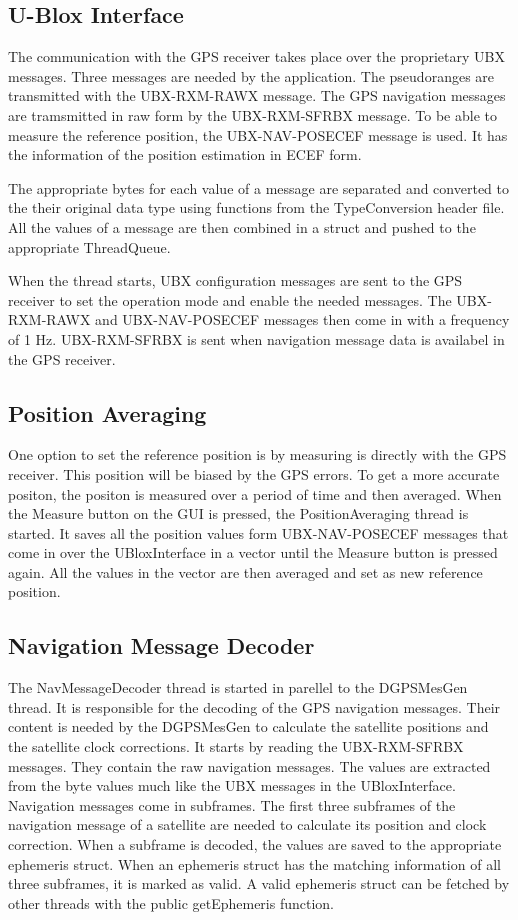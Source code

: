 \subsection{U-Blox Interface}

The communication with the GPS receiver takes place over the proprietary UBX messages.
Three messages are needed by the application.
The pseudoranges are transmitted with the UBX-RXM-RAWX message.
The GPS navigation messages are tramsmitted in raw form by the UBX-RXM-SFRBX message.
To be able to measure the reference position, the UBX-NAV-POSECEF message is used.
It has the information of the position estimation in ECEF form.

The appropriate bytes for each value of a message are separated and converted to the their original data type using functions from the TypeConversion header file.
All the values of a message are then combined in a struct and pushed to the appropriate ThreadQueue.

When the thread starts, UBX configuration messages are sent to the GPS receiver to set the operation mode and enable the needed messages.
The UBX-RXM-RAWX and UBX-NAV-POSECEF messages then come in with a frequency of 1 Hz.
UBX-RXM-SFRBX is sent when navigation message data is availabel in the GPS receiver.

\subsection{Position Averaging}

One option to set the reference position is by measuring is directly with the GPS receiver.
This position will be biased by the GPS errors.
To get a more accurate positon, the positon is measured over a period of time and then averaged.
When the Measure button on the GUI is pressed, the PositionAveraging thread is started.
It saves all the position values form UBX-NAV-POSECEF messages that come in over the UBloxInterface in a vector until the Measure button is pressed again.
All the values in the vector are then averaged and set as new reference position.

\subsection{Navigation Message Decoder}

The NavMessageDecoder thread is started in parellel to the DGPSMesGen thread.
It is responsible for the decoding of the GPS navigation messages.
Their content is needed by the DGPSMesGen to calculate the satellite positions and the satellite clock corrections.
It starts by reading the UBX-RXM-SFRBX messages.
They contain the raw navigation messages.
The values are extracted from the byte values much like the UBX messages in the UBloxInterface.
Navigation messages come in subframes.
The first three subframes of the navigation message of a satellite are needed to calculate its position and clock correction.
When a subframe is decoded, the values are saved to the appropriate ephemeris struct.
When an ephemeris struct has the matching information of all three subframes, it is marked as valid.
A valid ephemeris struct can be fetched by other threads with the public getEphemeris function.

